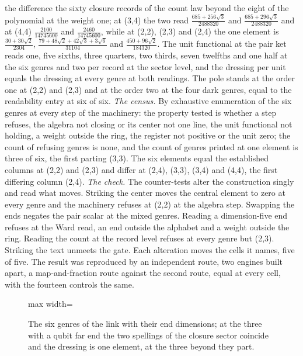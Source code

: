 \begin{chproof}
the difference the sixty closure records of the count law beyond the eight of the polynomial at the weight one; at (3,4) the two read $\tfrac{685 + 256\sqrt{3}}{2488320}$ and $\tfrac{685 + 296\sqrt{3}}{2488320}$ and at (4,4) $\tfrac{2100}{14745600}$ and $\tfrac{2460}{14745600}$, while at (2,2), (2,3) and (2,4) the one element is $\tfrac{30 + 30\sqrt{2}}{2304}$, $\tfrac{79 + 48\sqrt{2} + 42\sqrt{3} + 3\sqrt{6}}{31104}$ and $\tfrac{450 + 96\sqrt{2}}{184320}$. The unit functional at the pair ket reads one, five sixths, three quarters, two thirds, seven twelfths and one half at the six genres and two per record at the sector level, and the dressing per unit equals the dressing at every genre at both readings. The pole stands at the order one at (2,2) and (2,3) and at the order two at the four dark genres, equal to the readability entry at six of six.
\textit{The census.} By exhaustive enumeration of the six genres at every step of the machinery: the property tested is whether a step refuses, the algebra not closing or its center not one line, the unit functional not holding, a weight outside the ring, the register not positive or the unit zero; the count of refusing genres is none, and the count of genres printed at one element is three of six, the first parting (3,3). The six elements equal the established columns at (2,2) and (2,3) and differ at (2,4), (3,3), (3,4) and (4,4), the first differing column (2,4).
\textit{The check.} The counter-tests alter the construction singly and read what moves. Striking the center moves the central element to zero at every genre and the machinery refuses at (2,2) at the algebra step. Swapping the ends negates the pair scalar at the mixed genres. Reading a dimension-five end refuses at the Ward read, an end outside the alphabet and a weight outside the ring. Reading the count at the record level refuses at every genre but (2,3). Striking the text unmeets the gate. Each alteration moves the cells it names, five of five. The result was reproduced by an independent route, two engines built apart, a map-and-fraction route against the second route, equal at every cell, with the fourteen controls the same.
\begin{figure}[h]\centering\begin{adjustbox}{max width=\linewidth}\end{adjustbox}\caption{The six genres of the link with their end dimensions; at the three with a qubit far end the two spellings of the closure sector coincide and the dressing is one element, at the three beyond they part.}\end{figure}
\end{chproof}
